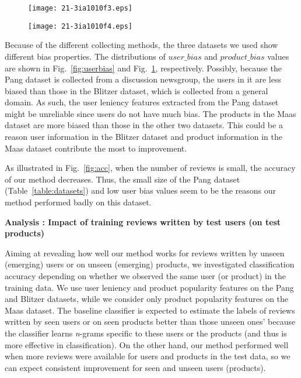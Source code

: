 \documentclass[english]{jnlp_1.4}
\begin{document}
\begin{figure}[b]
\setlength{\captionwidth}{200pt}
	\begin{minipage}[t]{200pt}
\begin{center}
	\texttt{[image: 21-3ia1010f3.eps]}
\end{center}
	\label{fig:userbias}
	\end{minipage}
	\hfill
	\begin{minipage}[t]{200pt}
\begin{center}
	\texttt{[image: 21-3ia1010f4.eps]}
\end{center}
	\label{fig:prodbias}
	\end{minipage}
\end{figure}

Because of the different collecting methods, the three datasets we used show different bias properties. 
The distributions of $user\_bias$ and $product\_bias$ values are shown in Fig.~\ref{fig:userbias} and Fig.~\ref{fig:prodbias}, respectively. 
Possibly, because the Pang dataset is collected from a discussion newsgroup, the users in it are less biased than those in the Blitzer dataset, which is collected from a general domain.
As such, the user leniency features extracted from the Pang dataset might be unreliable since users do not have much bias.
The products in the Maas dataset are more biased than those in the other two datasets.
This could be a reason user information in the Blitzer dataset and product information in the Maas dataset contribute the most to improvement. 

As illustrated in Fig.~\ref{fig:acc}, when the number of reviews is small, the accuracy of our method decreases.
Thus, the small size of the Pang dataset (Table~\ref{table:datasets}) and low user bias values seem to be the reasons our method performed badly on this dataset.


\noindent
\textbf{Analysis {}: Impact of training reviews written by test users  (on test products)}

Aiming at revealing how well our method works for reviews written by unseen (emerging) users or on unseen (emerging) products,
we investigated classification accuracy depending on whether we observed the same user (or product)  in the training data.
We use user leniency and product popularity features on the Pang and Blitzer datasets, while we consider only product popularity features on the Maas dataset.
The baseline classifier is expected to estimate the labels of reviews written by seen users or on seen products better than those unseen ones' because the classifier learns {\em n}-grams specific to these users or the products (and thus is more effective in classification).
On the other hand, our method performed well when more reviews were available for users and products in the test data, so we can expect consistent improvement for seen and unseen users (products).
\end{document}
